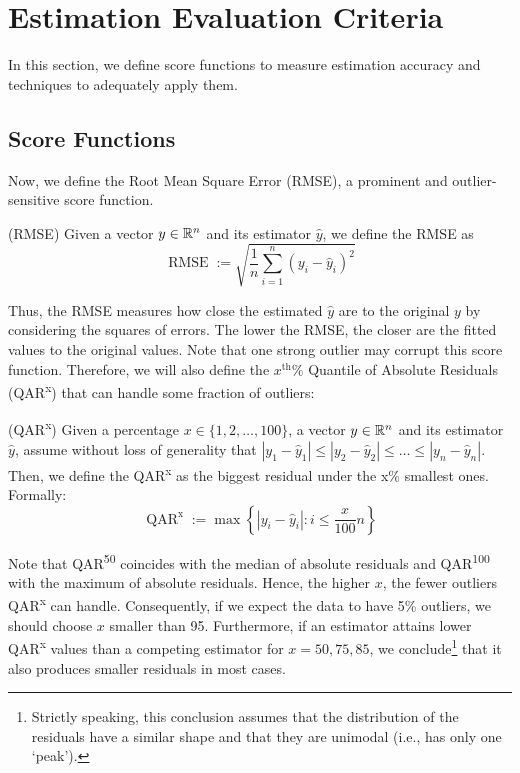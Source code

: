 \section{Estimation Evaluation Criteria}{ \label{sec:general_methods}
	In this section, we define score functions to measure estimation accuracy and techniques to adequately apply them. 

	\subsection{Score Functions}\label{sec:scorefun}
	    Now, we define the Root Mean Square Error (RMSE), a prominent and outlier-sensitive score function.
	    \begin{definition}(RMSE)\label{def:rmse}
		Given a vector $y\in \mathbb{R}^n$ and its estimator $\hat y$, we define the RMSE as
		\begin{equation}
			\label{eq:rmse}
			 \operatorname{RMSE}:=\sqrt{\frac{1}{n}\sum_{i=1}^n (y_i - \hat y_i)^2}
		\end{equation}
		\end{definition}
		Thus, the RMSE measures how close the estimated $\hat y$ are to the original $y$ by considering the squares of errors. The lower the RMSE, the closer are the fitted values to the original values. Note that one strong outlier may corrupt this score function. Therefore, we will also define the $x^\text{th}\%$ Quantile of Absolute Residuals (QAR\textsuperscript{x}) that can handle some fraction of outliers:
		\begin{definition} (QAR\textsuperscript{x}) \label{def:qar}
		    Given a percentage $x\in \{1,2,\dots,100\}$, a vector $y\in \mathbb{R}^n$ and its estimator $\hat y$, assume without loss of generality that $|y_1-\hat y_1|\leq |y_2-\hat y_2|\leq \dots \leq |y_n-\hat y_n|$. Then, we define the QAR\textsuperscript{x} as the biggest residual under the x\% smallest ones. Formally:  
		    \begin{equation}
		        \operatorname{QAR}^{\text{x}}:=\max \left\{|y_i-\hat y_i|:i\leq \frac{x}{100}n \right\}
		    \end{equation}
		\end{definition}
		Note that QAR\textsuperscript{50} coincides with the median of absolute residuals and QAR\textsuperscript{100} with the maximum of absolute residuals. Hence, the higher $x$, the fewer outliers QAR\textsuperscript{x} can handle. Consequently, if we expect the data to have 5\% outliers, we should choose $x$ smaller than 95. Furthermore, if an estimator attains lower QAR\textsuperscript{x} values than a competing estimator for $x=50,75,85$, we conclude\footnote{Strictly speaking, this conclusion assumes that the distribution of the residuals have a similar shape and that they are unimodal (i.e., has only one `peak').} that it also produces smaller residuals in most cases.  
		
}
